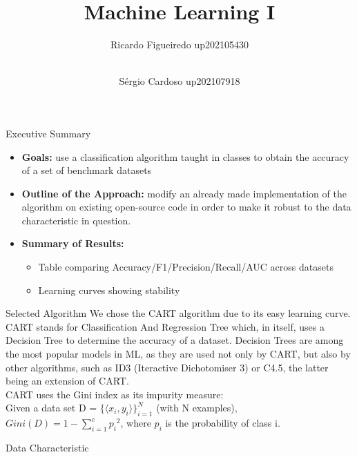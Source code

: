 \documentclass{beamer}
\title{Machine Learning I}
\author[Ricardo Figueiredo, Sérgio Cardoso]{
    Ricardo Figueiredo up202105430 
    \and  \\
    Sérgio Cardoso up202107918
}
\begin{document}
\maketitle

\begin{frame}{Executive Summary}
    \begin{itemize}
        \item \textbf{Goals:} use a classification algorithm taught in classes 
        to obtain the accuracy of a set of benchmark datasets
        \item \textbf{Outline of the Approach:} modify an already 
        made implementation of the algorithm on existing open-source 
        code in order to make it robust to the data 
        characteristic in question.
        \item \textbf{Summary of Results:} 
        \begin{itemize}
            \item Table comparing Accuracy/F1/Precision/Recall/AUC across datasets
            \item Learning curves showing stability
        \end{itemize}
    \end{itemize}
\end{frame}

\begin{frame}{Selected Algorithm}
    We chose the CART algorithm due to its easy learning curve. 
    CART stands for Classification And Regression Tree which, in 
    itself, uses a Decision Tree to determine the accuracy of a dataset. 
    Decision Trees are among the most popular models in ML, as they are used 
    not only by CART, but also by other algorithms, such as ID3 (Iteractive 
    Dichotomiser 3) or C4.5, the latter being an extension of CART. \\  
    CART uses the Gini index as its impurity measure: \\
        Given a data set D = $\{ \langle x_{i}, 
        y_{i}\rangle \}_{i = 1}^{N}$ (with N examples), $Gini(D) = 1 - \sum_{i = 1}^{c} {p_{i}}^2$, where
        $p_{i}$ is the probability of class i. \\
\end{frame}

\begin{frame}{Data Characteristic}
    
\end{frame}
\end{document}
